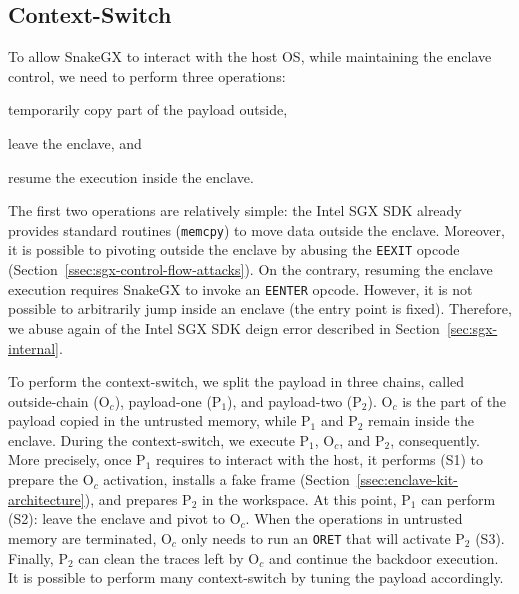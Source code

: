 \subsection{Context-Switch}
\label{ssec:switch-context}

To allow SnakeGX to interact with the host OS, while 
maintaining the enclave control,
we need to perform three operations:
\begin{enumerate*}[label=(S\arabic*)]
	\item temporarily copy part of the payload outside,
	\item leave the enclave, and
	\item resume the execution inside the enclave.
\end{enumerate*}
The first two operations are relatively simple: the Intel SGX SDK already 
provides standard routines (\eg \texttt{memcpy})
to move data outside the enclave.
Moreover, it is possible to pivoting outside the enclave by abusing the 
\texttt{EEXIT} opcode (Section~\ref{ssec:sgx-control-flow-attacks}). 
On the contrary, resuming the enclave execution requires SnakeGX to invoke
an \texttt{EENTER} opcode.
However, it is not possible to arbitrarily jump inside an enclave (\ie the 
entry point is fixed).
Therefore, we abuse again of the Intel SGX SDK deign error described in 
Section~\ref{sec:sgx-internal}.

To perform the context-switch, we split the payload in three chains, called 
outside-chain 
(O$_c$), payload-one (P$_1$), and payload-two (P$_2$).
O$_c$ is the part of the payload copied in the untrusted memory,
while P$_1$ and P$_2$ remain inside the enclave.
During the context-switch, we execute P$_1$, O$_c$, and P$_2$, 
consequently.
More precisely, once P$_1$ requires to interact with the host, it performs (S1) 
to prepare the O$_c$ activation, installs a fake frame
(Section~\ref{ssec:enclave-kit-architecture}), and prepares P$_2$ in the 
workspace.
At this point, P$_1$ can perform (S2): leave the enclave and pivot to 
O$_c$.
When the operations in untrusted memory are terminated, O$_c$ only needs to run 
an \texttt{ORET} that will activate P$_2$ (S3).
Finally, P$_2$ can clean the traces left by O$_c$ and continue the backdoor 
execution.
It is possible to perform many context-switch by tuning the payload accordingly.

